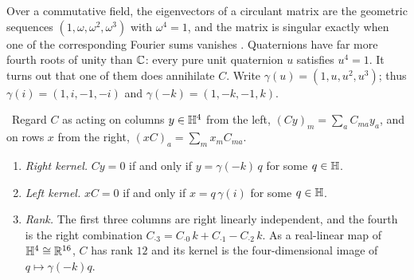 Over a commutative field, the eigenvectors of a circulant matrix are the geometric sequences $(1,\omega,\omega^2,\omega^3)$ with $\omega^4=1$, and the matrix is singular exactly when one of the corresponding Fourier sums vanishes \cite{Davis}. Quaternions have far more fourth roots of unity than $\mathbb{C}$: every pure unit quaternion $u$ satisfies $u^4=1$. It turns out that one of them does annihilate $C$. Write $\gamma(u)=(1,u,u^2,u^3)$; thus $\gamma(i)=(1,i,-1,-i)$ and $\gamma(-k)=(1,-k,-1,k)$.

\begin{theorem}\label{thm:rank3}\ver\
Regard $C$ as acting on columns $y\in\mathbb{H}^4$ from the left, $(Cy)_m=\sum_aC_{ma}y_a$, and on rows $x$ from the right, $(xC)_a=\sum_mx_mC_{ma}$.
\begin{enumerate}[label=(\roman*)]
\item \emph{Right kernel.} $Cy=0$ if and only if $y=\gamma(-k)\,q$ for some $q\in\mathbb{H}$.
\item \emph{Left kernel.} $xC=0$ if and only if $x=q\,\gamma(i)$ for some $q\in\mathbb{H}$.
\item \emph{Rank.} The first three columns are right linearly independent, and the fourth is the right combination $C_{\cdot3}=C_{\cdot0}\,k+C_{\cdot1}-C_{\cdot2}\,k$. As a real-linear map of $\mathbb{H}^4\cong\mathbb{R}^{16}$, $C$ has rank $12$ and its kernel is the four-dimensional image of $q\mapsto\gamma(-k)q$.
\end{enumerate}
\end{theorem}

